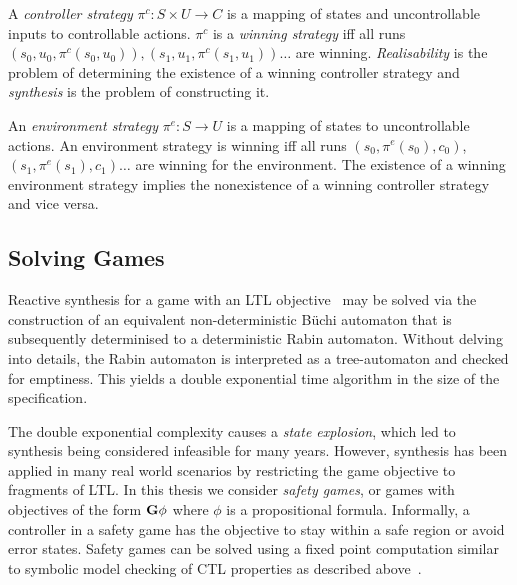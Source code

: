 

A \emph{controller strategy} $\pi^c : S \times U \to C$ is a mapping of states and uncontrollable inputs to controllable actions. $\pi^c$ is a \emph{winning strategy} iff all runs $(s_0, u_0, \pi^c(s_0, u_0)), (s_1, u_1, \pi^c(s_1, u_1)) \dots$ are winning. \emph{Realisability} is the problem of determining the existence of a winning controller strategy and \emph{synthesis} is the problem of constructing it.

An \emph{environment strategy} $\pi^e : S \to U$ is a mapping of states to uncontrollable actions. An environment strategy is winning
iff all runs $(s_0, \pi^e(s_0), c_0)$, $(s_1, \pi^e(s_1), c_1) \dots$ are winning for the environment. The existence of a winning environment strategy implies the nonexistence of a winning controller strategy and vice versa.

\subsection{Solving Games}

Reactive synthesis for a game with an LTL objective~\cite{Pnueli89} may be solved via the construction of an equivalent non-deterministic B\"uchi automaton that is subsequently determinised to a deterministic Rabin automaton. Without delving into details, the Rabin automaton is interpreted as a tree-automaton and checked for emptiness. This yields a double exponential time algorithm in the size of the specification.

The double exponential complexity causes a \emph{state explosion}, which led to synthesis being considered infeasible for many years. However, synthesis has been applied in many real world scenarios by restricting the game objective to fragments of LTL. In this thesis we consider \emph{safety games}, or games with objectives of the form $\textbf{G} \phi$ where $\phi$ is a propositional formula. Informally, a controller in a safety game has the objective to stay within a safe region or avoid error states. Safety games can be solved using a fixed point computation similar to symbolic model checking of CTL properties as described above~\cite{Asarin95}.

